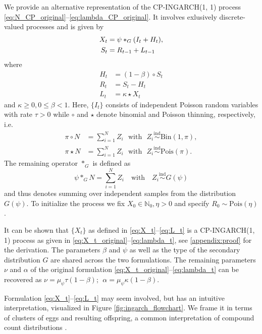 \documentclass[review]{elsarticle}
\begin{document}
We provide an alternative representation of the CP-INGARCH(1, 1) process \eqref{eq:N_CP_original}--\eqref{eq:lambda_CP_original}. It involves exlusively discrete-valued processes and is given by
\begin{align}
X_t & = \psi *_G (I_t + H_t),\label{eq:X_t}\\
S_t & = R_{t - 1} + L_{t - 1}\label{eq:juv_t}
\end{align}
where
\begin{align}
H_t & = (1 - \beta) \circ S_t\\
R_t & = S_t - H_t \label{eq:R_t}\\
L_t & = \kappa \star X_t \label{eq:L_t}
\end{align}
and $\kappa \geq 0, 0 \leq \beta <1$. Here, $\{I_t\}$ consists of independent Poisson random variables with rate $\tau > 0$ while $\circ$ and $\star$ denote binomial and Poisson thinning, respectively, i.e.\
\begin{align*}
\pi \circ N & = \sum_{i = 1}^N Z_i \ \ \ \text{with} \ \ \ Z_i \stackrel{\text{ind}}{\sim} \text{Bin}(1, \pi), \\
\pi \star N & = \sum_{i = 1}^N Z_i \ \ \ \text{with} \ \ \ Z_i \stackrel{\text{ind}}{\sim} \text{Pois}(\pi).
\end{align*}
The remaining operator $*_G$ is defined as
$$
\psi *_G N = \sum_{i = 1}^N Z_i \ \ \ \text{ with } \ \ \ Z_i \stackrel{\text{ind}}{\sim} G(\psi)
$$
and thus denotes summing over independent samples from the distribution $G(\psi)$. To initialize the process we fix $X_0 \in \mathbb{N}_0, \eta > 0$ and specify $R_0 \sim \text{Pois}\left(\eta \right)$.

It can be shown that $\{X_t\}$ as defined in \eqref{eq:X_t}--\eqref{eq:L_t} is a CP-INGARCH(1, 1) process as given in \eqref{eq:X_t_original}--\eqref{eq:lambda_t}, see \ref{appendix:proof} for the derivation. The parameters $\beta$ and $\psi$ as well as the type of the secondary distribution $G$ are shared across the two formulations. The remaining parameters $\nu$ and $\alpha$ of the original formulation \eqref{eq:X_t_original}--\eqref{eq:lambda_t} can be recovered as
$
\nu = \mu_\psi \tau(1 - \beta); \ \
\alpha = \mu_\psi \kappa(1 - \beta).
$

Formulation \eqref{eq:X_t}--\eqref{eq:L_t} may seem involved, but has an intuitive interpretation, visualized in Figure \ref{fig:ingarch_flowchart}. We frame it in terms of clusters of eggs and resulting offspring, a common interpretation of compound count distributions \cite{Neyman1939}.
\end{document}
